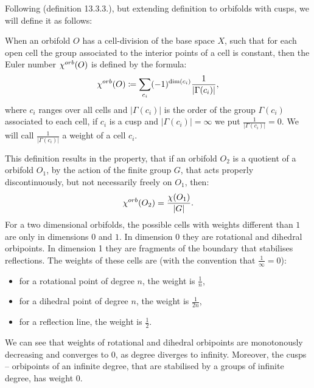 
Following \cite{Thurston1979} (definition 13.3.3.), but extending 
definition to orbifolds with cusps, we will define it as follows:
\begin{definition}
When an orbifold $O$ has a cell-division of the base space $X$, such that for each
open cell the group associated to
the interior points of a cell is constant, then the Euler number ${\chi^{orb}(O)}$ is defined by
the formula:
\begin{equation}
{\chi^{orb}(O)} \coloneqq \sum_{c_i} (-1)^{ \mathrm{dim}(c_i)}\frac{1}{|\Gamma(c_i)|},
\end{equation}
where $c_i$ ranges over all cells and $|\Gamma(c_i)|$ is the order of the group $\Gamma(c_i)$ 
associated to each cell, if $c_i$ is a cusp and $|\Gamma(c_i)| = \infty$ we put 
$\frac{1}{|\Gamma(c_i)|} = 0$. We will call $\frac{1}{|\Gamma(c_i)|}$ a weight of a cell $c_i$.
\end{definition} 

This definition results in the property, that if an orbifold $O_2$ is a quotient 
of a orbifold $O_1$, by the action of the finite group $G$, that acts properly 
discontinuously, but not necessarily freely on $O_1$, then:
\begin{equation}\label{acting on an orbifold cho}
{\chi^{orb}(O_2)} = \frac{\chi(O_1)}{|G|}.
\end{equation}
For a two dimensional orbifolds, the possible cells with weights different than $1$ are 
only in dimensions $0$ and $1$. In dimension 0 they are rotational and dihedral 
orbipoints. In dimension 1 they are fragments of the boundary that stabilises reflections. 
The weights of these cells are (with the convention that $\frac{1}{\infty} = 0$):
\begin{itemize}
\item for a rotational point of degree $n$, the weight is $\frac{1}{n}$,
\item for a dihedral point of degree $n$, the weight is $\frac{1}{2n}$,
\item for a reflection line, the weight is $\frac{1}{2}$.
\end{itemize}
We can see that weights of rotational and dihedral orbipoints are monotonously decreasing 
and converges to $0$, as degree diverges to infinity. Moreover, the 
cusps -- orbipoints of an infinite degree, 
that are stabilised by a groups of infinite degree, has weight $0$.

